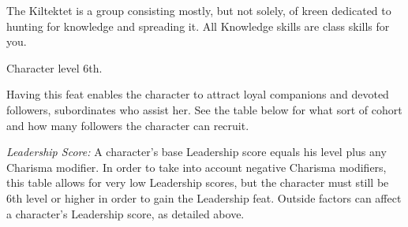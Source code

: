 {The Kiltektet is a group consisting mostly, but not solely, of kreen dedicated to hunting for knowledge and spreading it.}{}
{All Knowledge skills are class skills for you.}{}{}

{Character level 6th.}
{Having this feat enables the character to attract loyal companions and devoted followers, subordinates who assist her. See the table below for what sort of cohort and how many followers the character can recruit.


\textit{Leadership Score:} A character's base Leadership score equals his level plus any Charisma modifier. In order to take into account negative Charisma modifiers, this table allows for very low Leadership scores, but the character must still be 6th level or higher in order to gain the Leadership feat. Outside factors can affect a character's Leadership score, as detailed above.

}
